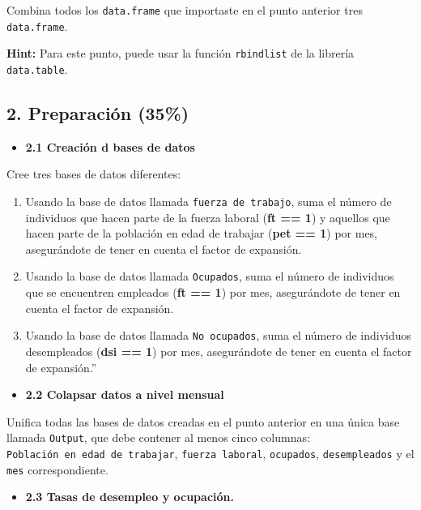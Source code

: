 \documentclass[
]{article}
\providecommand{\tightlist}{%
  \setlength{\itemsep}{0pt}\setlength{\parskip}{0pt}}
\begin{document}
Combina todos los \texttt{data.frame} que importaste en el punto
anterior tres \texttt{data.frame}.

\textbf{Hint:} Para este punto, puede usar la función \texttt{rbindlist}
de la librería \texttt{data.table}.

\subsection{\texorpdfstring{\textbf{2. Preparación
(35\%)}}{2. Preparación (35\%)}}\label{preparaciuxf3n-35}

\begin{itemize}
\tightlist
\item
  \textbf{2.1 Creación d bases de datos}
\end{itemize}

Cree tres bases de datos diferentes:

\begin{enumerate}
\def\labelenumi{\arabic{enumi}.}
\item
  Usando la base de datos llamada \texttt{fuerza\ de\ trabajo}, suma el
  número de individuos que hacen parte de la fuerza laboral (\textbf{ft
  == 1}) y aquellos que hacen parte de la población en edad de trabajar
  (\textbf{pet == 1}) por mes, asegurándote de tener en cuenta el factor
  de expansión.
\item
  Usando la base de datos llamada \texttt{Ocupados}, suma el número de
  individuos que se encuentren empleados (\textbf{ft == 1}) por mes,
  asegurándote de tener en cuenta el factor de expansión.
\item
  Usando la base de datos llamada \texttt{No\ ocupados}, suma el número
  de individuos desempleados (\textbf{dsi == 1}) por mes, asegurándote
  de tener en cuenta el factor de expansión.''
\end{enumerate}

\begin{itemize}
\tightlist
\item
  \textbf{2.2 Colapsar datos a nivel mensual}
\end{itemize}

Unifica todas las bases de datos creadas en el punto anterior en una
única base llamada \texttt{Output}, que debe contener al menos cinco
columnas: \texttt{Población\ en\ edad\ de\ trabajar},
\texttt{fuerza\ laboral}, \texttt{ocupados}, \texttt{desempleados} y el
\texttt{mes} correspondiente.

\begin{itemize}
\tightlist
\item
  \textbf{2.3 Tasas de desempleo y ocupación.}
\end{itemize}
\end{document}
